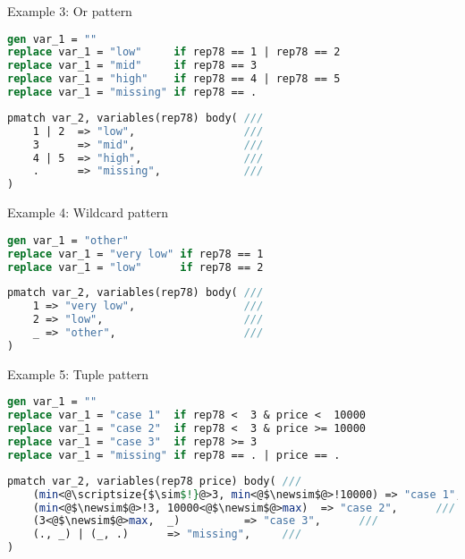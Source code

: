 \documentclass[11pt]{beamer}
\let\newsim\sim
\renewcommand{\newsim}{\mathrel{\mathpalette\bueckirel\sim}}
\newcommand{\bueckirel}[2]{%
  \raisebox{\depth}{\scalebox{0.808}{$#1#2$}}%
}
\begin{document}
\begin{frame}[fragile]{Example 3: Or pattern}
\label{example_3}

\footnotesize
\begin{lstlisting}[language=Stata]
gen var_1 = ""
replace var_1 = "low"     if rep78 == 1 | rep78 == 2
replace var_1 = "mid"     if rep78 == 3
replace var_1 = "high"    if rep78 == 4 | rep78 == 5
replace var_1 = "missing" if rep78 == .
\end{lstlisting}

\begin{lstlisting}[language=Stata]
pmatch var_2, variables(rep78) body( ///
    1 | 2  => "low",                 ///
    3      => "mid",                 ///
    4 | 5  => "high",                ///
    .      => "missing",             ///
)
\end{lstlisting}
\end{frame}

\begin{frame}[fragile]{Example 4: Wildcard pattern}
\label{example_4}

\footnotesize
\begin{lstlisting}[language=Stata]
gen var_1 = "other"
replace var_1 = "very low" if rep78 == 1
replace var_1 = "low"      if rep78 == 2
\end{lstlisting}

\begin{lstlisting}[language=Stata]
pmatch var_2, variables(rep78) body( ///
    1 => "very low",                 ///
    2 => "low",                      ///
    _ => "other",                    ///
)
\end{lstlisting}
\end{frame}

\begin{frame}[fragile]{Example 5: Tuple pattern}
\label{example_5}

\footnotesize
\begin{lstlisting}[language=Stata]
gen var_1 = ""
replace var_1 = "case 1"  if rep78 <  3 & price <  10000
replace var_1 = "case 2"  if rep78 <  3 & price >= 10000
replace var_1 = "case 3"  if rep78 >= 3
replace var_1 = "missing" if rep78 == . | price == .
\end{lstlisting}

\begin{lstlisting}[language=Stata]
pmatch var_2, variables(rep78 price) body( ///
    (min<@\scriptsize{$\sim$!}@>3, min<@$\newsim$@>!10000) => "case 1",      ///
    (min<@$\newsim$@>!3, 10000<@$\newsim$@>max)  => "case 2",      ///
    (3<@$\newsim$@>max,  _)          => "case 3",      ///
    (., _) | (_, .)      => "missing",     ///
)
\end{lstlisting}
\end{frame}
\end{document}
